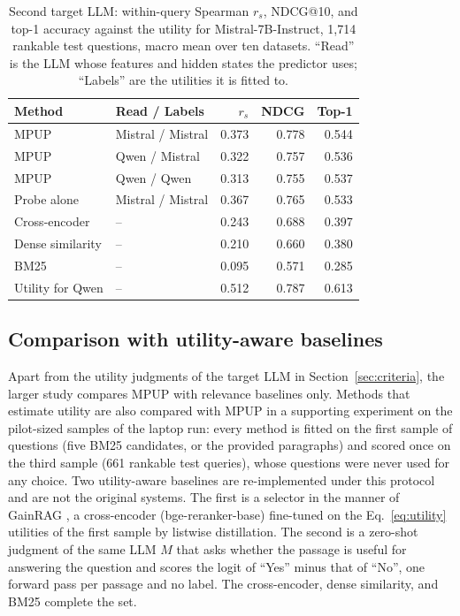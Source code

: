 \documentclass[preprint,12pt,authoryear]{elsarticle}
\begin{document}
\begin{table}[htbp]
    \centering
    \caption{Second target LLM: within-query Spearman $r_s$, NDCG@10, and top-1 accuracy against the utility for Mistral-7B-Instruct, 1,714 rankable test questions, macro mean over ten datasets. ``Read'' is the LLM whose features and hidden states the predictor uses; ``Labels'' are the utilities it is fitted to.}
    \label{tab:crossllm}
    \footnotesize
    \begin{tabular}{llrrr}
        \toprule
        \textbf{Method} & \textbf{Read / Labels} & \textbf{$r_s$} & \textbf{NDCG} & \textbf{Top-1} \\
        \midrule
        MPUP & Mistral / Mistral & 0.373 & 0.778 & 0.544 \\
        MPUP & Qwen / Mistral & 0.322 & 0.757 & 0.536 \\
        MPUP & Qwen / Qwen & 0.313 & 0.755 & 0.537 \\
        Probe alone & Mistral / Mistral & 0.367 & 0.765 & 0.533 \\
        \midrule
        Cross-encoder & -- & 0.243 & 0.688 & 0.397 \\
        Dense similarity & -- & 0.210 & 0.660 & 0.380 \\
        BM25 & -- & 0.095 & 0.571 & 0.285 \\
        \midrule
        Utility for Qwen & -- & 0.512 & 0.787 & 0.613 \\
        \bottomrule
    \end{tabular}
\end{table}

\subsection{Comparison with utility-aware baselines}\label{sec:sota}
Apart from the utility judgments of the target LLM in Section~\ref{sec:criteria}, the larger study compares MPUP with relevance baselines only. Methods that estimate utility are also compared with MPUP in a supporting experiment on the pilot-sized samples of the laptop run: every method is fitted on the first sample of questions (five BM25 candidates, or the provided paragraphs) and scored once on the third sample (661 rankable test queries), whose questions were never used for any choice. Two utility-aware baselines are re-implemented under this protocol and are not the original systems. The first is a selector in the manner of GainRAG \citep{jiang2025}, a cross-encoder (bge-reranker-base) fine-tuned on the Eq.~\eqref{eq:utility} utilities of the first sample by listwise distillation. The second is a zero-shot judgment of the same LLM $M$ that asks whether the passage is useful for answering the question and scores the logit of ``Yes'' minus that of ``No'', one forward pass per passage and no label. The cross-encoder, dense similarity, and BM25 complete the set.
\end{document}
